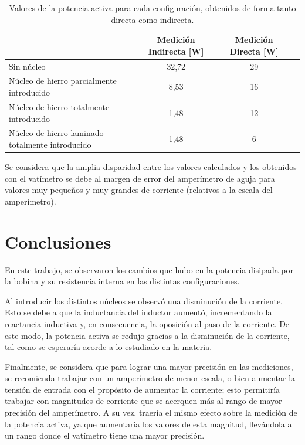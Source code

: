 \documentclass{article}
\begin{document}
            \begin{table}[h]
                \begin{tabular}{|p{5cm}|c|c|c|}
                \hline
                                                    & Medición Indirecta [W]   & Medición Directa [W] \\ \hline
                Sin núcleo                                        & 32,72                   & 29                        \\ \hline
                Núcleo de hierro parcialmente introducido            &       8,53        & 16                        \\ \hline
                Núcleo de hierro totalmente introducido             &      1,48          & 12                                 \\ \hline
                Núcleo de hierro laminado totalmente introducido   & 1,48               & 6              \\ \hline
                \end{tabular}
                \caption{Valores de la potencia activa para cada configuración, obtenidos de forma tanto directa como indirecta.}
                \label{tab:PotenciasActivas}
            \end{table}

            Se considera que la amplia disparidad entre los valores calculados y los obtenidos con el vatímetro se debe
            al margen de error del amperímetro de aguja para valores muy pequeños y muy grandes de corriente (relativos
            a la escala del amperímetro).

             
    \section{Conclusiones}
	En este trabajo, se observaron los cambios que hubo en la potencia disipada por la bobina y su resistencia interna
    en las distintas configuraciones. \par

    Al introducir los distintos núcleos se observó una disminución de la corriente. Esto se debe a que la inductancia
    del inductor aumentó, incrementando la reactancia inductiva y, en consecuencia, la oposición al paso de la
    corriente. De este modo, la potencia activa se redujo gracias a la disminución de la corriente, tal como se esperaría
    acorde a lo estudiado en la materia. \par

    Finalmente, se considera que para lograr una mayor precisión en las mediciones, se recomienda trabajar con un
    amperímetro de menor escala, o bien aumentar la tensión de entrada con el propósito de aumentar la corriente; esto
    permitiría trabajar con magnitudes de corriente que se acerquen más al rango de mayor precisión del amperímetro. A su
    vez, traería el mismo efecto sobre la medición de la potencia activa, ya que aumentaría los valores de esta magnitud,
    llevándola a un rango donde el vatímetro tiene una mayor precisión.\par
\end{document}
